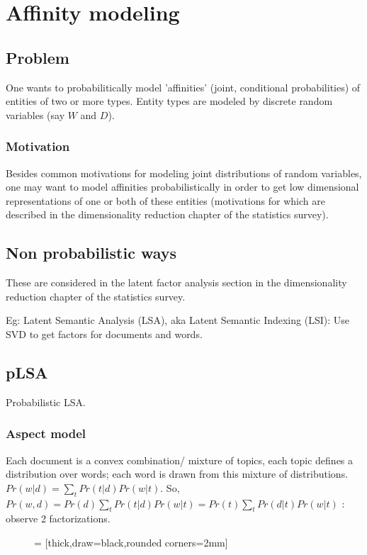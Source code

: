 \documentclass[oneside, article]{memoir}
\begin{document}
\chapter{Affinity modeling}
\section{Problem}
One wants to probabilitically model 'affinities' (joint, conditional probabilities) of entities of two or more types. Entity types are modeled by discrete random variables (say $W$ and $D$). 

\subsection{Motivation}
Besides common motivations for modeling joint distributions of random variables, one may want to model affinities probabilistically in order to get low dimensional representations of one or both of these entities (motivations for which are described in the dimensionality reduction chapter of the statistics survey).

\section{Non probabilistic ways}
These are considered in the latent factor analysis section in the dimensionality reduction chapter of the statistics survey.

Eg: Latent Semantic Analysis (LSA), aka Latent Semantic Indexing (LSI): Use SVD to get factors for documents and words.

\section{pLSA}
Probabilistic LSA.

\subsection{Aspect model}
Each document is a convex combination/ mixture of topics, each topic defines a distribution over words; each word is drawn from this mixture of distributions. $Pr(w|d) = \sum_t Pr(t|d)Pr(w|t)$. So, $Pr(w, d) = Pr(d)\sum_t Pr(t|d)Pr(w|t) = Pr(t)\sum_t Pr(d|t)Pr(w|t)$ : observe 2 factorizations.

\begin{figure}[!htb]
 = [thick,draw=black,rounded corners=2mm]
\end{figure}
\end{document}
